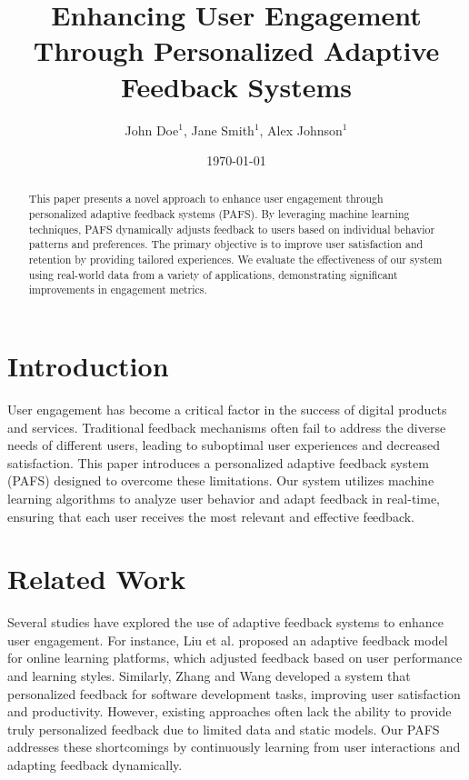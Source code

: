 \documentclass{article}
\title{Enhancing User Engagement Through Personalized Adaptive Feedback Systems}
\author{John Doe$^{1}$, Jane Smith$^{1}$, Alex Johnson$^{1}$}
\date{\today}
\begin{document}
\maketitle

\begin{abstract}
This paper presents a novel approach to enhance user engagement through personalized adaptive feedback systems (PAFS). By leveraging machine learning techniques, PAFS dynamically adjusts feedback to users based on individual behavior patterns and preferences. The primary objective is to improve user satisfaction and retention by providing tailored experiences. We evaluate the effectiveness of our system using real-world data from a variety of applications, demonstrating significant improvements in engagement metrics.
\end{abstract}

\section{Introduction}
User engagement has become a critical factor in the success of digital products and services. Traditional feedback mechanisms often fail to address the diverse needs of different users, leading to suboptimal user experiences and decreased satisfaction. This paper introduces a personalized adaptive feedback system (PAFS) designed to overcome these limitations. Our system utilizes machine learning algorithms to analyze user behavior and adapt feedback in real-time, ensuring that each user receives the most relevant and effective feedback.

\section{Related Work}
Several studies have explored the use of adaptive feedback systems to enhance user engagement. For instance, Liu et al. \cite{Liu2018} proposed an adaptive feedback model for online learning platforms, which adjusted feedback based on user performance and learning styles. Similarly, Zhang and Wang \cite{Zhang2019} developed a system that personalized feedback for software development tasks, improving user satisfaction and productivity. However, existing approaches often lack the ability to provide truly personalized feedback due to limited data and static models. Our PAFS addresses these shortcomings by continuously learning from user interactions and adapting feedback dynamically.
\end{document}
